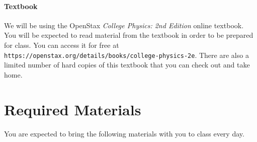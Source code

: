 \documentclass[10pt]{exam}
\begin{document}
\paragraph{Textbook} We will be using the OpenStax \textit{College Physics: 2nd Edition} online textbook.  You will be expected to read material from the textbook in order to be prepared for class.  You can access it for free at \texttt{https://openstax.org/details/books/college-physics-2e}.  There are also a limited number of hard copies of this textbook that you can check out and take home.


\section*{Required Materials}

You are expected to bring the following materials with you to class every day.  

\begin{center}


\end{center}
\end{document}
